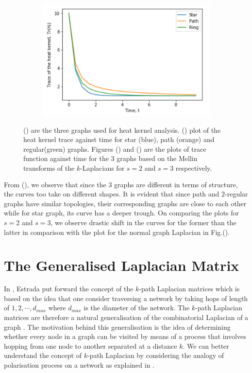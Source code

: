 \documentclass[12pt]{article}
\begin{document}
\begin{figure}[H]
\begin{subfigure}[b]{0.45\textwidth}
		\caption{}
		\label{starpathmellins2}
	\end{subfigure}~
	\begin{subfigure}[b]{0.45\textwidth}
		\includegraphics[width= \textwidth]{images/mellin-s-3.png}
		\caption{}
		\label{starpathmellins3}
	\end{subfigure}
	\caption{() are the three graphs used for heat kernel analysis. () plot of the heat kernel trace against time for star (blue), path (orange) and regular(green) graphs. Figures () and () are the plots of trace function against time for the $3$ graphs based on the Mellin transforms of the $k$-Laplacians for $s=2$ and $s=3$ respectively.}
\end{figure}
From (), we observe that since the $3$ graphs are different in terms of structure, the curves too take on different shapes. It is evident that since path and $2$-regular graphs have similar topologies, their corresponding graphs are close to each other while for star graph, its curve has a deeper trough. 
On comparing the plots for $s=2$ and $s=3$, we observe drastic shift in the curves for the former than the latter in comparison with the plot for the normal graph Laplacian in Fig.().

\section{The Generalised Laplacian Matrix}
In \citep{estrada2012path}, Estrada put forward the concept of the $k$-path Laplacian matrices which is based on the idea that one consider traversing a network by taking hops of length of $1, 2, \cdots, d_{max}$ where $d_{max}$ is the diameter of the network. The $k$-path Laplacian matrices are therefore a natural generalisation of the combinatorial Laplacian of a graph \citep{estrada2012path}. The motivation behind this generalisation is the idea of determining whether every node in a graph can be visited by means of a process that involves hopping from one node to another separated at a distance $k$. We can better understand the concept of $k$-path Laplacian by considering the analogy of polarisation process on a network as explained in \citep{estrada2012path}.  
\end{document}
